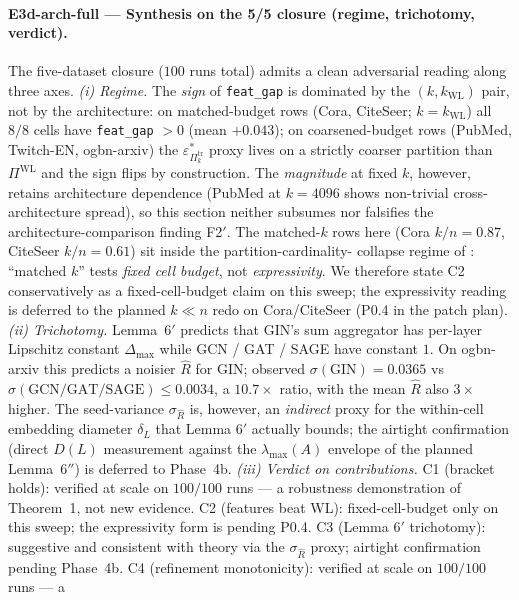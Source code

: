 \documentclass[10pt]{article}
\theoremstyle{definition}
\theoremstyle{remark}
\begin{document}
\paragraph{E3d-arch-full --- Synthesis on the 5/5 closure (regime, trichotomy, verdict).}
The five-dataset closure ($100$ runs total) admits a clean
adversarial reading along three axes. \emph{(i) Regime.} The
\emph{sign} of \texttt{feat\_gap} is dominated by the
$(k, k_{\mathrm{WL}})$ pair, not by the architecture: on
matched-budget rows (Cora, CiteSeer; $k = k_{\mathrm{WL}}$) all
$8/8$ cells have \texttt{feat\_gap} $> 0$ (mean $+0.043$);
on coarsened-budget rows (PubMed, Twitch-EN, ogbn-arxiv) the
$\varepsilon^{*}_{\Pi^{\mathrm{tr}}_{k}}$ proxy lives on a
strictly coarser partition than $\Pi^{\mathrm{WL}}$ and the sign
flips by construction. The \emph{magnitude} at fixed $k$,
however, retains architecture dependence (PubMed at $k = 4096$
shows non-trivial cross-architecture spread), so this section
neither subsumes nor falsifies the architecture-comparison
finding F2$'$. The matched-$k$ rows here (Cora $k/n = 0.87$,
CiteSeer $k/n = 0.61$) sit inside the partition-cardinality-
collapse regime of : ``matched
$k$'' tests \emph{fixed cell budget}, not \emph{expressivity}.
We therefore state C2 conservatively as a fixed-cell-budget
claim on this sweep; the expressivity reading is deferred to
the planned $k \ll n$ redo on Cora/CiteSeer (P0.4 in the
patch plan).
\emph{(ii) Trichotomy.} Lemma~6$'$ predicts that GIN's sum
aggregator has per-layer Lipschitz constant $\Delta_{\max}$
while GCN / GAT / SAGE have constant $1$. On ogbn-arxiv this
predicts a noisier $\hat R$ for GIN; observed
$\sigma(\mathrm{GIN}) = 0.0365$ vs $\sigma(\mathrm{GCN/GAT/SAGE}) \le 0.0034$,
a $10.7\times$ ratio, with the mean $\hat R$ also $3\times$ higher.
The seed-variance $\sigma_{\hat R}$ is, however, an
\emph{indirect} proxy for the within-cell embedding diameter
$\delta_L$ that Lemma 6$'$ actually bounds; the airtight
confirmation (direct $D(L)$ measurement against the
$\lambda_{\max}(A)$ envelope of the planned Lemma~6$''$) is
deferred to Phase~4b.
\emph{(iii) Verdict on contributions.} C1 (bracket holds):
verified at scale on $100/100$ runs --- a robustness
demonstration of Theorem~1, not new evidence. C2 (features beat
WL): fixed-cell-budget only on this sweep; the expressivity
form is pending P0.4. C3 (Lemma 6$'$ trichotomy): suggestive
and consistent with theory via the $\sigma_{\hat R}$ proxy;
airtight confirmation pending Phase~4b. C4 (refinement
monotonicity): verified at scale on $100/100$ runs --- a
\end{document}
